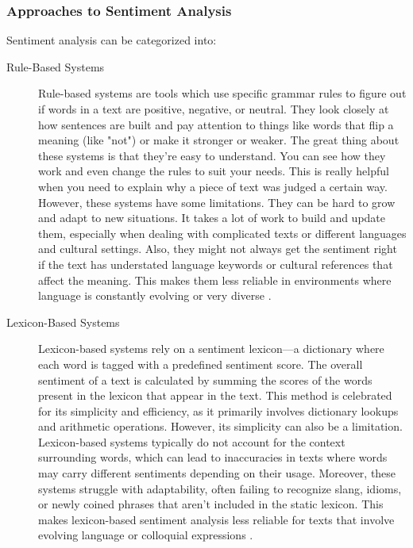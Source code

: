 \subsubsection{Approaches to Sentiment Analysis}
Sentiment analysis can be categorized into:
\begin{description}
    \item[Rule-Based Systems] Rule-based systems are tools which use specific grammar rules to figure out if words in a text are positive, negative, or neutral. They look closely at how sentences are built and pay attention to things like words that flip a meaning (like "not") or make it stronger or weaker. The great thing about these systems is that they're easy to understand. You can see how they work and even change the rules to suit your needs. This is really helpful when you need to explain why a piece of text was judged a certain way. However, these systems have some limitations. They can be hard to grow and adapt to new situations. It takes a lot of work to build and update them, especially when dealing with complicated texts or different languages and cultural settings. Also, they might not always get the sentiment right if the text has understated language keywords or cultural references that affect the meaning. This makes them less reliable in environments where language is constantly evolving or very diverse \cite{liu2012}.
    \item[Lexicon-Based Systems] Lexicon-based systems rely on a sentiment lexicon—a dictionary where each word is tagged with a predefined sentiment score. The overall sentiment of a text is calculated by summing the scores of the words present in the lexicon that appear in the text. This method is celebrated for its simplicity and efficiency, as it primarily involves dictionary lookups and arithmetic operations. However, its simplicity can also be a limitation. Lexicon-based systems typically do not account for the context surrounding words, which can lead to inaccuracies in texts where words may carry different sentiments depending on their usage. Moreover, these systems struggle with adaptability, often failing to recognize slang, idioms, or newly coined phrases that aren't included in the static lexicon. This makes lexicon-based sentiment analysis less reliable for texts that involve evolving language or colloquial expressions \cite{10.1162/COLI_a_00049}.

\end{description}
